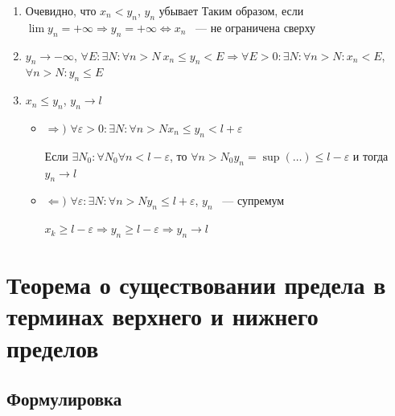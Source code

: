 \documentclass{article}
\begin{document}
            \begin{enumerate}
            
                \item Очевидно, что $x_n < y_n$, $y_n$ убывает Таким образом, если $\lim y_n = +\infty \Longrightarrow y_n = +\infty \Longleftrightarrow x_n$ ~--- не ограничена сверху
                
                \item $y_n \rightarrow -\infty$, $\forall E : \exists N : \forall n > N \ x_n \leq y_n < E \Rightarrow \forall E > 0 : \exists N : \forall n > N : x_n < E$, $\forall n > N : y_n \leq E$
                
                \item $x_n \leq y_n$, $y_n \rightarrow l$
                
                \begin{itemize}
                
                    \item $\Rightarrow)$ $\forall \varepsilon > 0 : \exists N : \forall n > N x_n \leq y_n < l + \varepsilon$
                    
                        Если $\exists N_0 : \forall N_0 \forall n < l - \varepsilon$, то $\forall n > N_0 y_n = \sup(\ldots) \leq l - \varepsilon$ и тогда $y_n \rightarrow l$
                        
                    \item $\Leftarrow)$ $\forall \varepsilon : \exists N : \forall n > N y_n \leq l + \varepsilon$, $y_n$ ~--- супремум
                    
                        $x_k \geq l - \varepsilon \Rightarrow y_n \geq l - \varepsilon \Rightarrow y_n \rightarrow l$
                        
                \end{itemize}
                
            \end{enumerate}
            
    \newpage
    
    \section{Теорема о существовании предела в терминах верхнего и нижнего пределов}
    
        \subsection{Формулировка}
        
\end{document}
